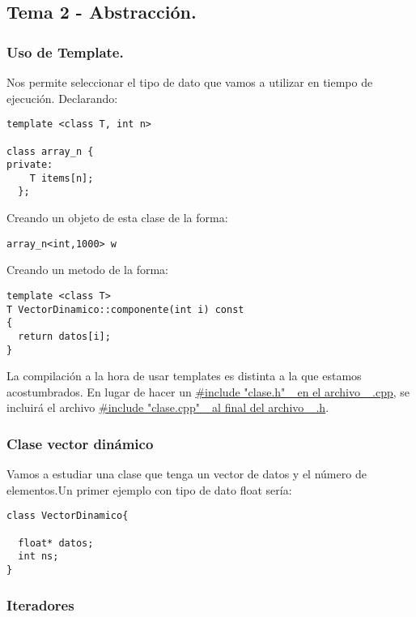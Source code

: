\documentclass[11pt]{article}
\begin{document}
\subsection{Tema 2 - Abstracción.}
\label{sec-1-3}
\subsubsection{Uso de Template.}
\label{sec-1-3-1}

Nos permite seleccionar el tipo de dato que vamos a utilizar en tiempo de ejecución.
Declarando:

\begin{verbatim}
template <class T, int n>

class array_n {
private:
    T items[n];
  };
\end{verbatim}

Creando un objeto de esta clase de la forma:

\begin{verbatim}
array_n<int,1000> w
\end{verbatim}
Creando un metodo de la forma:

\begin{verbatim}
template <class T>
T VectorDinamico::componente(int i) const
{
  return datos[i];
}
\end{verbatim}

La compilación a la hora de usar templates es distinta a la que estamos acostumbrados. En lugar de hacer un \uline{\#include "clase.h"\_ en el archivo \_.cpp}, se incluirá el archivo \uline{\#include "clase.cpp"\_ al final del archivo \_.h}.

\subsubsection{Clase vector dinámico}
\label{sec-1-3-2}

Vamos a estudiar una clase que tenga un vector de datos y el número de elementos.Un primer ejemplo con tipo de dato float sería:

\begin{verbatim}
class VectorDinamico{

  float* datos;
  int ns;
}
\end{verbatim}


\subsubsection{Iteradores}
\label{sec-1-3-3}
\end{document}
